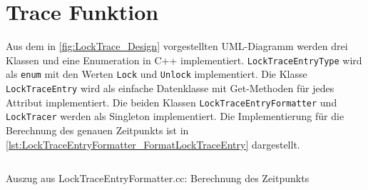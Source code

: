 \section{Trace Funktion}
\label{section:Implementierung:Trace Funktion}
Aus dem in \cref{fig:LockTrace_Design} vorgestellten UML-Diagramm werden drei
Klassen und eine Enumeration in C++ implementiert.
\texttt{Lock\-Trace\-Entry\-Type} wird als \texttt{enum} mit den Werten
\texttt{Lock} und \texttt{Unlock} implementiert. Die Klasse
\texttt{Lock\-Trace\-Entry} wird als einfache Datenklasse mit Get-Methoden für
jedes Attribut implementiert. Die beiden Klassen
\texttt{Lock\-Trace\-Entry\-Formatter} und \texttt{Lock\-Tracer} werden als
Singleton implementiert. Die Implementierung für die Berechnung des genauen
Zeitpunkts ist in \cref{lst:LockTraceEntryFormatter_FormatLockTraceEntry}
dargestellt.
\begin{listing}[ht]
  \inputminted[frame=lines,linenos,firstline=31,lastline=33]{cpp}{./cpp/LockTraceEntryFormatter.cc}
  \caption{Auszug aus LockTraceEntryFormatter.cc: Berechnung des Zeitpunkts}
  \label{lst:LockTraceEntryFormatter_FormatLockTraceEntry}   
\end{listing}

